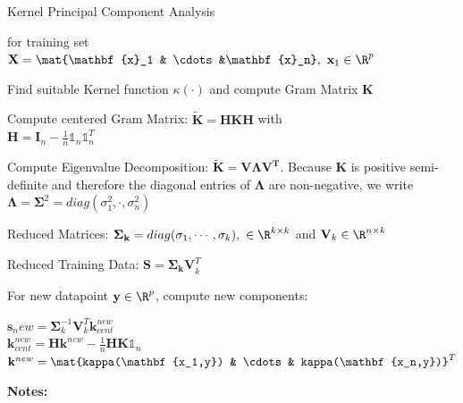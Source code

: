 \documentclass[english]{latex4ei/latex4ei_sheet}
\begin{document}
\begin{sectionbox}
\begin{cookbox}{Kernel Principal Component Analysis}
    \item  for training set $\mathbf{X}=\mat{\mathbf{x}_1 & \cdots &\mathbf{x}_n}, \ \mathbf{x}_1\in\R^p$
	\item Find suitable Kernel function $\kappa(\cdot)$ and compute Gram Matrix $\mathbf{K}$
	\item Compute centered Gram Matrix: $\mathbf{\tilde{K}=HKH}$ with\\ $\mathbf{H=I}_n-\frac{1}{n}\mathds{1}_n\mathds{1}_n^T$
	\item Compute Eigenvalue Decomposition: $\mathbf{\tilde{K}=V\Lambda V^T}$. Because $\mathbf{K}$ is positive semi-definite and therefore the diagonal entries of $\mathbf{\Lambda}$ are non-negative, we write $\mathbf{\Lambda=\Sigma}^2=diag(\sigma_1^2, \cdot, \sigma_n^2)$
	\item Reduced Matrices: $\mathbf{\Sigma_k}=diag(\sigma_1,\cdots,\sigma_k),\ \in\R^{k\times k}$ and $\mathbf{V}_k\in\R^{n\times k}$
	\item Reduced Training Data: $\mathbf{S=\Sigma_kV}_k^T$
	\item For new datapoint $\mathbf{y}\in\R^p$, compute new components: 
	\begin{center}
		$\mathbf{s}_new=\mathbf{\Sigma}_k^{-1}\mathbf{V}_k^T\mathbf{k}_{cent}^{new}$\\
	    $\mathbf{k}_{cent}^{new}=\mathbf{Hk}_{}^{new}-\frac{1}{n}\mathbf{HK}\mathds{1}_n$\\
		$\mathbf{k}^{new}=\mat{kappa(\mathbf{x_1,y}) & \cdots & kappa(\mathbf{x_n,y})}^T$
	\end{center}
\end{cookbox}
\end{sectionbox}
\textbf{Notes:}

\newpage
\end{document}

